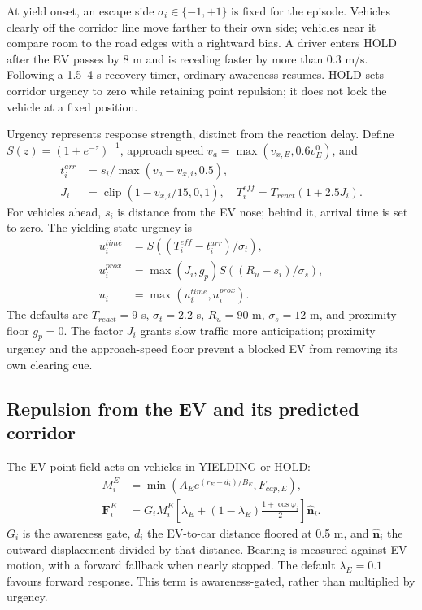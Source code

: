 \documentclass[conference,a4paper]{IEEEtran}
\newcommand{\clip}{\operatorname{clip}}
\begin{document}
At yield onset, an escape side $\sigma_i\in\{-1,+1\}$ is fixed for the episode. Vehicles clearly off the corridor line move farther to their own side; vehicles near it compare room to the road edges with a rightward bias. A driver enters HOLD after the EV passes by 8 m and is receding faster by more than 0.3 m/s. Following a 1.5--4 s recovery timer, ordinary awareness resumes. HOLD sets corridor urgency to zero while retaining point repulsion; it does not lock the vehicle at a fixed position.

Urgency represents response strength, distinct from the reaction delay. Define $S(z)=(1+e^{-z})^{-1}$, approach speed $v_a=\max(v_{x,E},0.6v_E^0)$, and
\begin{align}
t_i^{arr}&=s_i/\max(v_a-v_{x,i},0.5),\\
J_i&=\clip(1-v_{x,i}/15,0,1),\quad
T_i^{eff}=T_{react}(1+2.5J_i).
\end{align}
For vehicles ahead, $s_i$ is distance from the EV nose; behind it, arrival time is set to zero. The yielding-state urgency is
\begin{align}
u_i^{time}&=S((T_i^{eff}-t_i^{arr})/\sigma_t),\\
u_i^{prox}&=\max(J_i,g_p)S((R_u-s_i)/\sigma_s),\\
u_i&=\max(u_i^{time},u_i^{prox}).
\end{align}
The defaults are $T_{react}=9$ s, $\sigma_t=2.2$ s, $R_u=90$ m, $\sigma_s=12$ m, and proximity floor $g_p=0$. The factor $J_i$ grants slow traffic more anticipation; proximity urgency and the approach-speed floor prevent a blocked EV from removing its own clearing cue.

\subsection{Repulsion from the EV and its predicted corridor}
The EV point field acts on vehicles in YIELDING or HOLD:
\begin{align}
M_i^E&=\min(A_Ee^{(r_E-d_i)/B_E},F_{cap,E}),\\
\mathbf F_i^E&=G_iM_i^E
\left[\lambda_E+(1-\lambda_E)\frac{1+\cos\varphi_i}{2}\right]\hat{\mathbf n}_i.
\end{align}
$G_i$ is the awareness gate, $d_i$ the EV-to-car distance floored at 0.5 m, and $\hat{\mathbf n}_i$ the outward displacement divided by that distance. Bearing is measured against EV motion, with a forward fallback when nearly stopped. The default $\lambda_E=0.1$ favours forward response. This term is awareness-gated, rather than multiplied by urgency.
\end{document}
